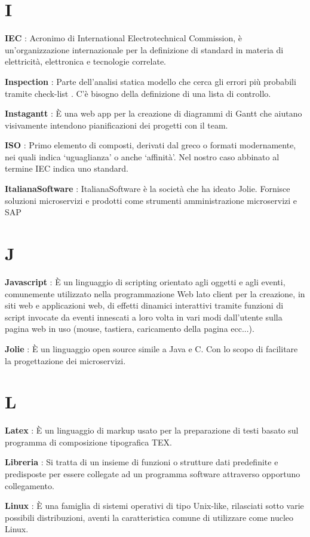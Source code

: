 \documentclass[12pt,a4paper,titlepage]{article}
\begin{document}
\section{I}
\begin{trivlist}
\item \textbf{IEC} : Acronimo di  International Electrotechnical Commission,  è un'organizzazione internazionale per la definizione di standard in materia di elettricità, elettronica e tecnologie correlate.
\item \textbf{Inspection} : Parte dell'analisi statica modello che cerca gli errori più probabili tramite check-list . C'è bisogno della definizione di una lista di controllo.
\item \textbf{Instagantt} : È una web app per la creazione di diagrammi di Gantt che aiutano visivamente intendono pianificazioni dei progetti con il team.
\item \textbf{ISO} : Primo elemento di composti, derivati dal greco o formati modernamente, nei quali indica ‘uguaglianza’ o anche ‘affinità’. Nel nostro caso abbinato al termine IEC indica uno standard.
\item \textbf{ItalianaSoftware} : ItalianaSoftware è la società che ha ideato Jolie. Fornisce soluzioni microservizi e prodotti come strumenti amministrazione microservizi e SAP
\end{trivlist}

\section{J}
\begin{trivlist}
\item \textbf{Javascript} : È un linguaggio di scripting orientato agli oggetti e agli eventi, comunemente utilizzato nella programmazione Web lato client per la creazione, in siti web e applicazioni web, di effetti dinamici interattivi tramite funzioni di script invocate da eventi innescati a loro volta in vari modi dall'utente sulla pagina web in uso (mouse, tastiera, caricamento della pagina ecc...).
\item \textbf{Jolie} : È un linguaggio open source simile a Java e C. Con lo scopo di facilitare la progettazione dei microservizi.
\end{trivlist}

\section{L}
\begin{trivlist}
\item \textbf{Latex} : È un linguaggio di markup usato per la preparazione di testi basato sul programma di composizione tipografica TEX.
\item \textbf{Libreria} :  Si tratta di un insieme di funzioni o strutture dati predefinite e predisposte per essere collegate ad un programma software attraverso opportuno collegamento. 
\item \textbf{Linux} : È una famiglia di sistemi operativi di tipo Unix-like, rilasciati sotto varie possibili distribuzioni, aventi la caratteristica comune di utilizzare come nucleo Linux.
\end{trivlist}
\end{document}
